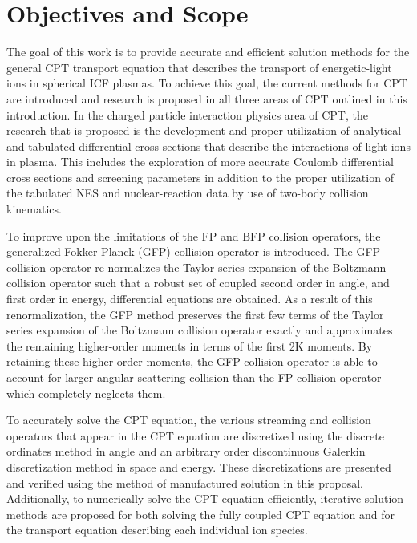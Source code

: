 \section{Objectives and Scope}
The goal of this work is to provide accurate and efficient solution methods for the general CPT transport equation that describes the transport of energetic-light ions in spherical ICF plasmas. To achieve this goal, the current methods for CPT are introduced and research is proposed in all three areas of CPT outlined in this introduction. In the charged particle interaction physics area of CPT, the research that is proposed is the development and proper utilization of analytical and tabulated differential cross sections that describe the interactions of light ions in plasma. This includes the exploration of more accurate Coulomb differential cross sections and screening parameters in addition to the proper utilization of the tabulated NES and nuclear-reaction data by use of two-body collision kinematics.

To improve upon the limitations of the FP and BFP collision operators, the generalized Fokker-Planck (GFP) collision operator is introduced. The GFP collision operator re-normalizes the Taylor series expansion of the Boltzmann collision operator such that a robust set of coupled second order in angle, and first order in energy, differential equations are obtained. As a result of this renormalization, the GFP method preserves the first few terms of the Taylor series expansion of the Boltzmann collision operator exactly and approximates the remaining higher-order moments in terms of the first 2K moments. By retaining these higher-order moments, the GFP collision operator is able to account for larger angular scattering collision than the FP collision operator which completely neglects them.

To accurately solve the CPT equation, the various streaming and collision operators that appear in the CPT equation are discretized using the discrete ordinates \Sn method in angle and an arbitrary order discontinuous Galerkin discretization method in space and energy. These discretizations are presented and verified using the method of manufactured solution in this proposal. Additionally, to numerically solve the CPT equation efficiently, iterative solution methods are proposed for both solving the fully coupled CPT equation and for the transport equation describing each individual ion species.